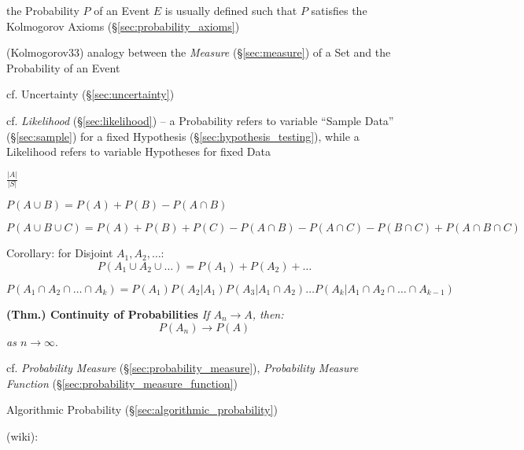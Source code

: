the Probability $P$ of an Event $E$ is usually defined such that $P$ satisfies
the Kolmogorov Axioms (\S\ref{sec:probability_axioms})

(Kolmogorov33) analogy between the \emph{Measure} (\S\ref{sec:measure}) of a Set
and the Probability of an Event

cf. Uncertainty (\S\ref{sec:uncertainty})

cf. \emph{Likelihood} (\S\ref{sec:likelihood}) -- a Probability refers to
variable ``Sample Data'' (\S\ref{sec:sample}) for a fixed Hypothesis
(\S\ref{sec:hypothesis_testing}), while a Likelihood refers to variable
Hypotheses for fixed Data

$\frac{|A|}{|S|}$

$P(A \cup B) = P(A) + P(B) - P(A \cap B)$

$P(A \cup B \cup C) = P(A) + P(B) + P(C) - P(A \cap B) - P(A \cap C) -
P(B \cap C) + P(A \cap B \cap C)$

Corollary: for Disjoint $A_1, A_2, \ldots$:
\[
  P(A_1 \cup A_2 \cup \ldots) = P(A_1) + P(A_2) + \ldots
\]

$P(A_1 \cap A_2 \cap \ldots \cap A_k) = P(A_1) P(A_2 | A_1) P(A_3 |
A_1 \cap A_2) \ldots P(A_k | A_1 \cap A_2 \cap \ldots \cap A_{k-1})$

\textbf{(Thm.) Continuity of Probabilities} \emph{If $A_n \rightarrow A$, then:}
\[
  P(A_n) \rightarrow P(A)
\]
\emph{as $n \rightarrow \infty$}.

cf. \emph{Probability Measure} (\S\ref{sec:probability_measure}),
\emph{Probability Measure Function} (\S\ref{sec:probability_measure_function})

\fist Algorithmic Probability (\S\ref{sec:algorithmic_probability})

(wiki):

